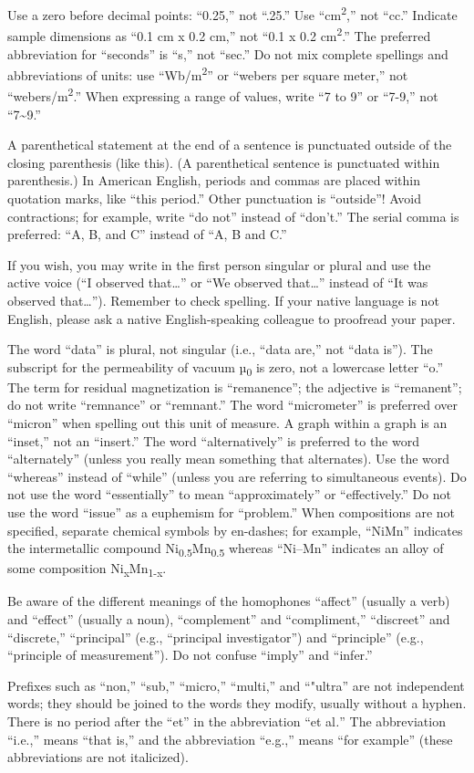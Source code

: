 Use a zero before decimal points: ``0.25,'' not ``.25.'' Use
``cm\textsuperscript{2},'' not ``cc.'' Indicate sample dimensions as
``0.1 cm x 0.2 cm,'' not ``0.1 x 0.2 cm\textsuperscript{2}.'' The
preferred abbreviation for ``seconds'' is ``s,'' not ``sec.'' Do not mix
complete spellings and abbreviations of units: use
``Wb/m\textsuperscript{2}'' or ``webers per square meter,'' not
``webers/m\textsuperscript{2}.'' When expressing a range of values,
write ``7 to 9'' or ``7-9,'' not ``7\textasciitilde9.''

A parenthetical statement at the end of a sentence is punctuated outside
of the closing parenthesis (like this). (A parenthetical sentence is
punctuated within parenthesis.) In American English, periods and commas
are placed within quotation marks, like ``this period.'' Other
punctuation is ``outside''! Avoid contractions; for example, write ``do
not'' instead of ``don't.'' The serial comma is preferred: ``A, B, and
C'' instead of ``A, B and C.''

If you wish, you may write in the first person singular or plural and
use the active voice (``I observed that\ldots'' or ``We observed
that\ldots'' instead of ``It was observed that\ldots''). Remember to
check spelling. If your native language is not English, please ask a
native English-speaking colleague to proofread your paper.

The word ``data'' is plural, not singular (i.e., ``data are,'' not
``data is''). The subscript for the permeability of vacuum
µ\textsubscript{0} is zero, not a lowercase letter ``o.'' The term for
residual magnetization is ``remanence''; the adjective is ``remanent'';
do not write ``remnance'' or ``remnant.'' The word ``micrometer'' is
preferred over ``micron'' when spelling out this unit of measure. A
graph within a graph is an ``inset,'' not an ``insert.'' The word
``alternatively'' is preferred to the word ``alternately'' (unless you
really mean something that alternates). Use the word ``whereas'' instead
of ``while'' (unless you are referring to simultaneous events). Do not
use the word ``essentially'' to mean ``approximately'' or
``effectively.'' Do not use the word ``issue'' as a euphemism for
``problem.'' When compositions are not specified, separate chemical
symbols by en-dashes; for example, ``NiMn'' indicates the intermetallic
compound Ni\textsubscript{0.5}Mn\textsubscript{0.5} whereas ``Ni--Mn''
indicates an alloy of some composition
Ni\textsubscript{x}Mn\textsubscript{1-x}.

Be aware of the different meanings of the homophones ``affect'' (usually
a verb) and ``effect'' (usually a noun), ``complement'' and
``compliment,'' ``discreet'' and ``discrete,'' ``principal'' (e.g.,
``principal investigator'') and ``principle'' (e.g., ``principle of
measurement''). Do not confuse ``imply'' and ``infer.''

Prefixes such as ``non,'' ``sub,'' ``micro,'' ``multi,'' and ``"ultra''
are not independent words; they should be joined to the words they
modify, usually without a hyphen. There is no period after the ``et'' in
the abbreviation ``et al\emph{.}'' The abbreviation ``i.e.,'' means
``that is,'' and the abbreviation ``e.g.,'' means ``for example'' (these
abbreviations are not italicized).

